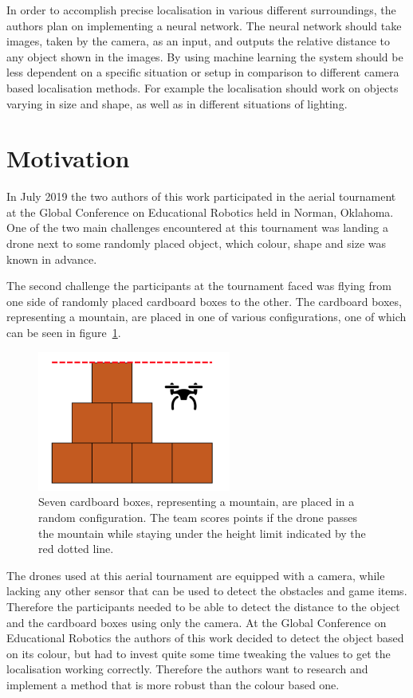 In order to accomplish precise localisation in various different surroundings, the authors plan on implementing a neural network. The neural network should take images, taken by the camera, as an input, and outputs the relative distance to any object shown in the images. By using machine learning the system should be less dependent on a specific situation or setup in comparison to different camera based localisation methods. For example the localisation should work on objects varying in size and shape, as well as in different situations of lighting.

\section{Motivation}
\label{sec:introduction_motivation}
In July 2019 the two authors of this work participated in the aerial tournament at the Global Conference on Educational Robotics held in Norman, Oklahoma. One of the two main challenges encountered at this tournament was landing a drone next to some randomly placed object, which colour, shape and size was known in advance.

The second challenge the participants at the tournament faced was flying from one side of randomly placed cardboard boxes to the other. The cardboard boxes, representing a mountain, are placed in one of various configurations, one of which can be seen in figure~\ref{pic:introduction_motivation_mountain}.

\begin{figure}[h]
	\centering
	\includegraphics[width=2.5in]{img/introduction_motivation_mountain.png}
	\caption{Seven cardboard boxes, representing a mountain, are placed in a random configuration. The team scores points if the drone passes the mountain while staying under the height limit indicated by the red dotted line.}
	\label{pic:introduction_motivation_mountain}
\end{figure}

The drones used at this aerial tournament are equipped with a camera, while lacking any other sensor that can be used to detect the obstacles and game items. Therefore the participants needed to be able to detect the distance to the object and the cardboard boxes using only the camera. At the Global Conference on Educational Robotics the authors of this work decided to detect the object based on its colour, but had to invest quite some time tweaking the values to get the localisation working correctly. Therefore the authors want to research and implement a method that is more robust than the colour based one.


